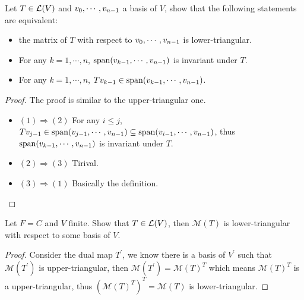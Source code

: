 \documentclass[../main.tex]{subfiles}
\begin{document}
\begin{exercise}
  Let $T \in \mathcal{L}(V)$ and $v_0 , \cdots , v_{n - 1}$ a basis of $V$, show that the following statements
  are equivalent:
  \begin{itemize}
    \item the matrix of $T$ with respect to $v_0 , \cdots , v_{n - 1}$ is lower-triangular.
    \item For any $k = 1, \cdots, n$, $\operatorname{span}(v_{k - 1}, \cdots, v_{n - 1})$ is invariant under $T$.
    \item For any $k = 1, \cdots, n$, $Tv_{k - 1} \in \operatorname{span}(v_{k - 1}, \cdots, v_{n - 1})$.
  \end{itemize}
\end{exercise}
\begin{proof}
  The proof is similar to the upper-triangular one.

  \begin{itemize}
    \item $(1) \Rightarrow (2)$ For any $i \le j$,
          $Tv_{j - 1} \in \operatorname{span}(v_{j - 1}, \cdots, v_{n - 1}) \subseteq \operatorname{span}(v_{i - 1}, \cdots, v_{n - 1})$,
          thus $\operatorname{span}(v_{k - 1}, \cdots, v_{n - 1})$ is invariant under $T$.
    \item $(2) \Rightarrow (3)$ Tirival.
    \item $(3) \Rightarrow (1)$ Basically the definition.
  \end{itemize}
\end{proof}

\begin{exercise}
  Let $F = C$ and $V$ finite. Show that $T \in \mathcal{L}(V)$, then $\mathcal{M}(T)$ is
  lower-triangular with respect to some basis of $V$.
\end{exercise}
\begin{proof}
  Consider the dual map $T^\prime$, we know there is a basis of $V^\prime$
  such that $\mathcal{M}(T^\prime)$ is upper-triangular, then $\mathcal{M}(T^\prime) = \mathcal{M}(T)^T$
  which means $\mathcal{M}(T)^T$ is a upper-triangular, thus $(\mathcal{M}(T)^T)^T = \mathcal{M}(T)$
  is lower-triangular.
\end{proof}
\end{document}
